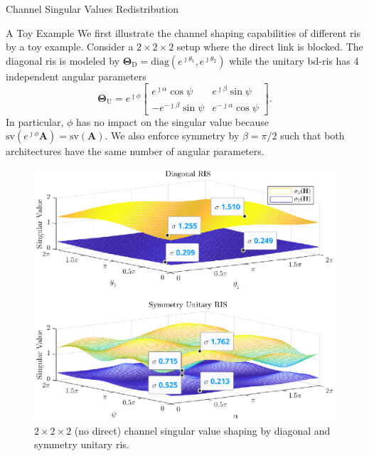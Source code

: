 \documentclass[journal]{IEEEtran}
\begin{document}
\begin{section}{Channel Singular Values Redistribution}
	\begin{subsection}{A Toy Example}\label{sc:toy_example}
		We first illustrate the channel shaping capabilities of different \gls{ris} by a toy example.
		Consider a $2 \times 2 \times 2$ setup where the direct link is blocked.
		The diagonal \gls{ris} is modeled by $\mathbf{\Theta}_\mathrm{D} = \mathrm{diag}(e^{\jmath \theta_1}, e^{\jmath \theta_2})$ while the unitary \gls{bd}-\gls{ris} has 4 independent angular parameters
		\begin{equation}
			\mathbf{\Theta}_\mathrm{U} = e^{\jmath \phi} \begin{bmatrix}
				e^{\jmath \alpha} \cos \psi  & e^{\jmath \beta} \sin \psi   \\
				-e^{-\jmath \beta} \sin \psi & e^{-\jmath \alpha} \cos \psi
			\end{bmatrix}.
		\end{equation}
		In particular, $\phi$ has no impact on the singular value because $\mathrm{sv}(e^{\jmath \phi} \mathbf{A}) = \mathrm{sv}(\mathbf{A})$.
		We also enforce symmetry by $\beta = \pi / 2$ such that both architectures have the same number of angular parameters.
		\begin{figure}
			\centering
			\includegraphics[width=\columnwidth]{assets/simulation/singular_trend.eps}
			\caption{$2 \times 2 \times 2$ (no direct) channel singular value shaping by diagonal and symmetry unitary \gls{ris}.}

\end{figure}
\end{subsection}
\end{section}
\end{document}
